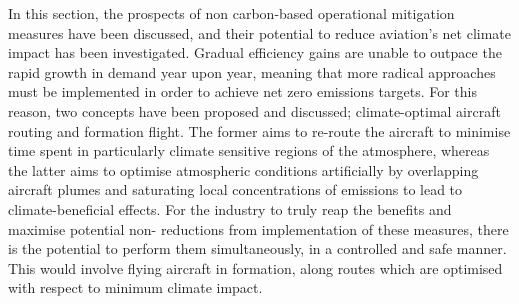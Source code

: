 In this section, the prospects of non carbon-based operational mitigation measures have been discussed, and their potential to reduce aviation's net climate impact has been investigated. Gradual efficiency gains are unable to outpace the rapid growth in demand year upon year, meaning that more radical approaches must be implemented in order to achieve net zero emissions targets. For this reason, two concepts have been proposed and discussed; climate-optimal aircraft routing and formation flight. The former aims to re-route the aircraft to minimise time spent in particularly climate sensitive regions of the atmosphere, whereas the latter aims to optimise atmospheric conditions artificially by overlapping aircraft plumes and saturating local concentrations of emissions to lead to climate-beneficial effects. For the industry to truly reap the benefits and maximise potential non- reductions from implementation of these measures, there is the potential to perform them simultaneously, in a controlled and safe manner. This would involve flying aircraft in formation, along routes which are optimised with respect to minimum climate impact.  






